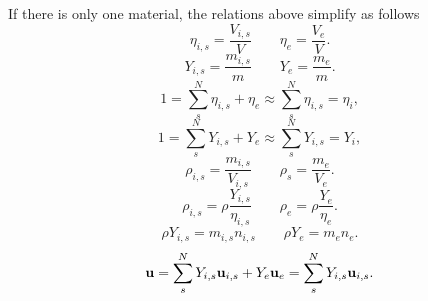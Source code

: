 \documentclass[a4paper,11pt]{report}
\begin{document}
If there is only one material, the relations above simplify as follows
\begin{equation}
    \eta_{i,s} = \frac{V_{i,s}}{V} \qquad \eta_e = \frac{V_e}{V}.
\end{equation}
\begin{equation}
    Y_{i,s} = \frac{m_{i,s}}{m} \qquad Y_e = \frac{m_e}{m}.
\end{equation}
\begin{equation}
    1 = \sum_s^N \eta_{i,s} + \eta_e \approx \sum_s^N \eta_{i,s} = \eta_i,
\end{equation} 
\begin{equation}
    1 = \sum_s^N Y_{i,s} + Y_e \approx \sum_s^N Y_{i,s} = Y_i,
\end{equation} 
\begin{equation}
    \rho_{i,s} = \frac{m_{i,s}}{V_{i,s}} \qquad \rho_s = \frac{m_e}{V_e}.
\end{equation}
\begin{equation}
    \rho_{i,s} = \rho \frac{Y_{i,s}}{\eta_{i,s}} \qquad \rho_e = \rho \frac{Y_e}{\eta_e}.
\end{equation}
\begin{equation}
    \label{eq:sf_mass_number_densities}
    \rho Y_{i,s} = m_{i,s} n_{i,s} \qquad \rho Y_e = m_e n_e.
\end{equation}
\begin{equation}
    \label{eq:sf_common_vel}
    \mathbf{u} = \sum_s^N Y_{i,s} \mathbf{u}_{i,s} + Y_e \mathbf{u}_e = \sum_s^N Y_{i,s} \mathbf{u}_{i,s}.
\end{equation}

\end{document}

